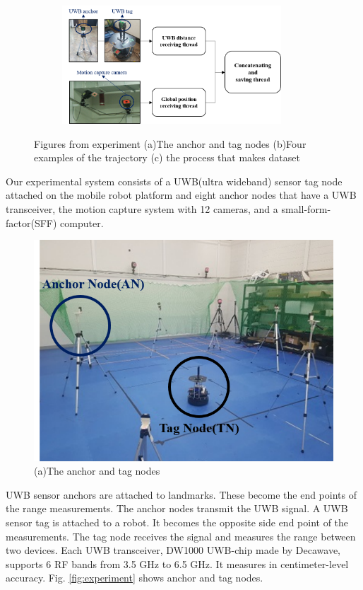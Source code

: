 \documentclass{ieeeaccess}
\begin{document}
\begin{figure}[h]
\begin{subfigure}[b]{.25\textwidth}
		\label{fig:nodes} 	
		\caption{}
	\end{subfigure}%
	\begin{subfigure}[b]{.5\textwidth}
		\centering
		\includegraphics[width=0.9\textwidth]{dataset_process}
		\label{fig:trajectories} 	
		\caption{}
	\end{subfigure}
	\caption{Figures from experiment (a)The anchor and tag nodes (b)Four examples of the trajectory (c) the process that makes dataset}
	\label{fig:experiments}
\end{figure}
Our experimental system consists of a UWB(ultra wideband) sensor tag node attached on the mobile robot platform and eight anchor nodes that have a UWB transceiver, the motion capture system with 12 cameras, and a small-form-factor(SFF) computer.


\begin{figure}[h]
	\centering
	\includegraphics[width=.4\textwidth]{anchor_tag_nodes}
	\caption{(a)The anchor and tag nodes}
	\label{fig:environment}
\end{figure}


UWB sensor anchors are attached to landmarks. These become the end points of the range measurements. The anchor nodes transmit the UWB signal. A UWB sensor tag is attached to a robot. It becomes the opposite side end point of the measurements. The tag node receives the signal and measures the range between two devices. Each UWB transceiver, DW1000 UWB-chip made by Decawave, supports 6 RF bands from 3.5 GHz to 6.5 GHz. It measures in centimeter-level accuracy. Fig. \ref{fig:experiment} shows anchor and tag nodes.
\end{document}

